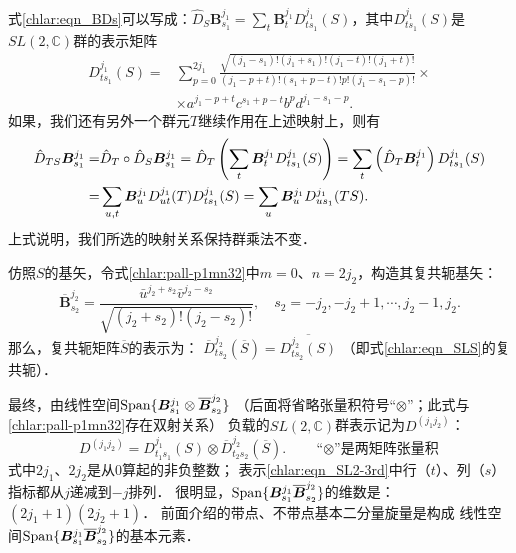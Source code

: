 式\eqref{chlar:eqn_BDs}可以写成：$\hat{D}_S \boldsymbol{B}^{j_1}_{s_1} = \sum_{t}
\boldsymbol{B}^{j_1}_{t}D^{j_1}_{ts_1 }(S)$，其中$D^{j_1}_{ts_1 }(S)$是$SL(2,\mathbb{C})$群的表示矩阵
\begin{equation}\label{chlar:eqn_SLS}
    \begin{aligned}
    D^{j_1}_{ts_1 }(S) =&  \sum_{p=0}^{2j_1} 
        \frac{\sqrt{(j_1-s_1)! (j_1+s_1)! (j_1-t)! (j_1+t)!}  }
{ (j_1-p+t)! (s_1+p-t)! p!(j_1-s_1-p)! } \times \\
& \times a^{j_1-p+t} c^{s_1+p-t} b^p d^{j_1-s_1-p} .
    \end{aligned}
\end{equation} %
如果，我们还有另外一个群元$T$继续作用在上述映射上，则有
\begin{align}
	\hat{D}_{TS} \boldsymbol{B}^{j_1}_{s_1} = &
	\hat{D}_T \circ \hat{D}_S \boldsymbol{B}^{j_1}_{s_1} = \hat{D}_T \left( 
	\sum_{t}\boldsymbol{B}^{j_1}_{t}D^{j_1}_{ts_1 }(S) \right)
	= \sum_{t} \left(  \hat{D}_T \boldsymbol{B}^{j_1}_{t} \right) D^{j_1}_{ts_1 }(S) \notag \\
	= & \sum_{u,t}  \boldsymbol{B}^{j_1}_{u} D^{j_1}_{u t }(T) D^{j_1}_{ts_1 }(S)
	= \sum_{u}  \boldsymbol{B}^{j_1}_{u} D^{j_1}_{u s_1 }(TS).
\end{align}
上式说明，我们所选的映射关系保持群乘法不变．

仿照$S$的基矢，令式\eqref{chlar:pall-p1mn32}中$m=0$、$n=2j_2$，构造其复共轭基矢：
\begin{equation}
    \overline{\boldsymbol{B}}^{j_2}_{s_2} = 
    \frac{\bar{u}^{j_2+s_2} \bar{v}^{j_2-s_2}}{\sqrt{(j_2+s_2)!(j_2-s_2)!}} ,\quad
    s_2 = -j_2, -j_2 +1, \cdots, j_2 -1, j_2.
\end{equation}
那么，复共轭矩阵$\overline{S}$的表示为：
$    \overline{D}^{j_2}_{t s_2 }(\overline{S}) =  \overline{D^{j_2}_{t s_2 }(S)}$
（即式\eqref{chlar:eqn_SLS}的复共轭）．

最终，由线性空间${\rm Span}\{\boldsymbol{B}^{j_1}_{s_1} \otimes\overline{\boldsymbol{B}}^{j_2}_{s_2}\}$
（后面将省略张量积符号“$\otimes$”；此式与\eqref{chlar:pall-p1mn32}存在双射关系）
负载的$SL(2,\mathbb{C})$群表示记为$\boxed{D^{(j_1 j_2)}}$：
\begin{equation}\label{chlar:eqn_SL2-3rd}
    D^{(j_1 j_2)} =  D^{j_1}_{t_1 s_1 }(S) \otimes \overline{D}^{j_2}_{t_2 s_2 }(\overline{S}) .
    \qquad \text{“$\otimes $”是两矩阵张量积}
\end{equation}
式中$2j_1$、$2j_2$是从$0$算起的非负整数；
表示\eqref{chlar:eqn_SL2-3rd}中行（$t$）、列（$s$）指标都从$j$递减到$-j$排列．
很明显，${\rm Span}\{\boldsymbol{B}^{j_1}_{s_1} \overline{\boldsymbol{B}}^{j_2}_{s_2}\}$的维数是：$(2j_1+1)(2j_2+1)$．
前面介绍的带点、不带点基本二分量旋量是构成
线性空间${\rm Span}\{\boldsymbol{B}^{j_1}_{s_1} \overline{\boldsymbol{B}}^{j_2}_{s_2}\}$的基本元素．



